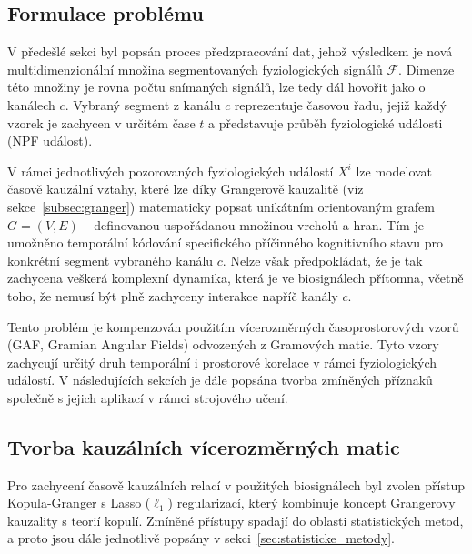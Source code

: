 \subsection{Formulace problému}
\label{subsec:definice_problemu}
V předešlé sekci byl popsán proces předzpracování dat, jehož výsledkem je nová
multidimenzionální množina segmentovaných fyziologických signálů $\mathcal{F}$.
Dimenze této množiny je rovna počtu snímaných signálů, lze tedy dál hovořit jako
o kanálech $c$. Vybraný segment z kanálu $c$ reprezentuje časovou řadu, jejiž
každý vzorek je zachycen v určitém čase $t$ a představuje průběh fyziologické
události (\gls{NPF} událost).

V rámci jednotlivých pozorovaných fyziologických událostí $X^i$ lze modelovat
časově kauzální vztahy, které lze díky Grangerově kauzalitě (viz
sekce~\ref{subsec:granger}) matematicky popsat unikátním orientovaným grafem
$G=(V,E)$ -- definovanou uspořádanou množinou vrcholů a hran. Tím je umožněno
temporální kódování specifického příčinného kognitivního stavu pro konkrétní
segment vybraného kanálu $c$. Nelze však předpokládat, že je tak zachycena
veškerá komplexní dynamika, která je ve biosignálech přítomna, včetně toho, že
nemusí být plně zachyceny interakce napříč kanály $c$.

Tento problém je kompenzován použitím vícerozměrných časoprostorových vzorů
(\gls{GAF}, Gramian Angular Fields) odvozených z Gramových matic. Tyto vzory
zachycují určitý druh temporální i prostorové korelace v rámci fyziologických
událostí. V následujících sekcích je dále popsána tvorba zmíněných příznaků
společně s jejich aplikací v rámci strojového učení.

\subsection{Tvorba kauzálních vícerozměrných matic}
\label{subsec:kauzalni_matice}
Pro zachycení časově kauzálních relací v použitých biosignálech byl zvolen
přístup Kopula-Granger s Lasso ($\ell_1$) regularizací, který kombinuje koncept
Grangerovy kauzality s teorií kopulí. Zmíněné přístupy spadají do oblasti
statistických metod, a proto jsou dále jednotlivě popsány v
sekci~\ref{sec:statisticke_metody}.

